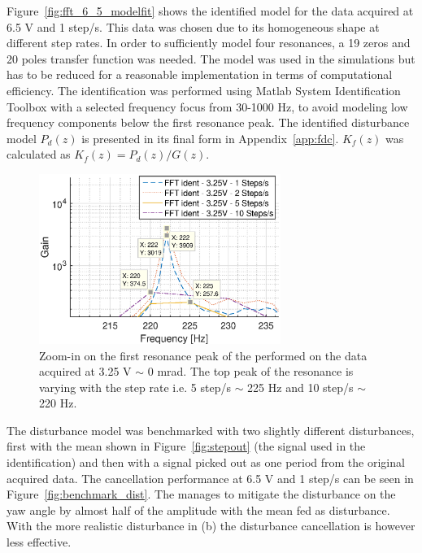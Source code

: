 Figure~\ref{fig:fft_6_5_modelfit} shows the identified model for the data acquired at 6.5 V and 1 step/s. This data was chosen due to its homogeneous shape at different step rates. In order to sufficiently model four resonances, a 19 zeros and 20 poles transfer function was needed. The model was used in the simulations but has to be reduced for a reasonable implementation in terms of computational efficiency. The identification was performed using Matlab System Identification Toolbox with a selected frequency focus from 30-1000 Hz, to avoid modeling low frequency components below the first resonance peak. The identified disturbance model $P_d(z)$ is presented in its final form in Appendix~\ref{app:fdc}. $K_f(z)$ was calculated as $K_f(z)=P_d(z)/G(z)$.

\begin{figure}[h!]
  \centering
  \includegraphics[width=0.7\textwidth]{fig/matlab/fft_mean_in_out_3V_zoomin.eps}
  \caption{\label{fig:3vzoomin} Zoom-in on the first resonance peak of the \abbrFFT performed on the data acquired at 3.25 V $\sim$ 0 mrad. The top peak of the resonance is varying with the step rate i.e. 5 step/s $\sim$ 225 Hz and 10 step/s $\sim$ 220 Hz.}
\end{figure}
\FloatBarrier

The disturbance model was benchmarked with two slightly different disturbances, first with the mean shown in Figure~\ref{fig:stepout} (the signal used in the identification) and then with a signal picked out as one period from the original acquired data. The cancellation performance at 6.5 V and 1 step/s can be seen in Figure~\ref{fig:benchmark_dist}. The \abbrFDC manages to mitigate the disturbance on the yaw angle by almost half of the amplitude with the mean fed as disturbance. With the more realistic disturbance in (b) the disturbance cancellation is however less effective.

